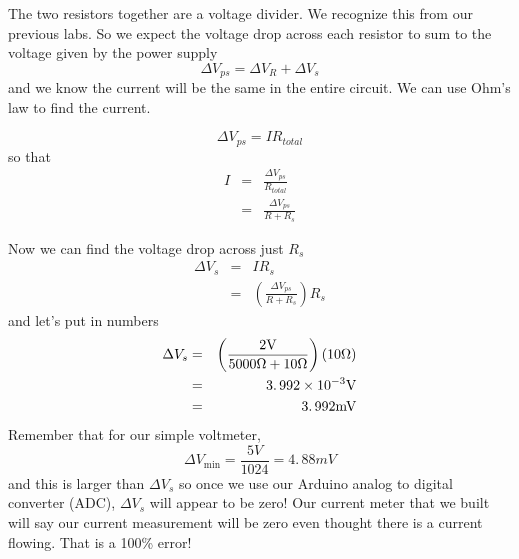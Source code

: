 The two resistors together are a voltage divider. We recognize this from our
previous labs. So we expect the voltage drop across each resistor to sum to
the voltage given by the power supply%
\begin{equation*}
\Delta V_{ps}=\Delta V_{R}+\Delta V_{s}
\end{equation*}%
and we know the current will be the same in the entire circuit. We can use
Ohm's law to find the current.

\begin{equation*}
\Delta V_{ps}=IR_{total}
\end{equation*}%
so that 
\begin{eqnarray*}
I &=&\frac{\Delta V_{ps}}{R_{total}} \\
&=&\frac{\Delta V_{ps}}{R+R_{s}}
\end{eqnarray*}

Now we can find the voltage drop across just $R_{s}$%
\begin{eqnarray*}
\Delta V_{s} &=&IR_{s} \\
&=&\left( \frac{\Delta V_{ps}}{R+R_{s}}\right) R_{s}
\end{eqnarray*}%
and let's put in numbers%
\begin{eqnarray*}
\Delta V_{s} &=&\left( \frac{2\unit{V}}{5000\unit{%
\Omega%
}+10\unit{%
\Omega%
}}\right) \left( 10\unit{%
\Omega%
}\right) \\
&=&3.\,\allowbreak 992\times 10^{-3}\unit{V} \\
&=&3.\,\allowbreak 992\unit{mV}
\end{eqnarray*}%
Remember that for our simple voltmeter, 
\begin{equation*}
\Delta V_{\min }=\frac{5\unit{V}}{1024}=4.\,\allowbreak 88\unit{mV}
\end{equation*}%
and this is larger than $\Delta V_{s}$ so once we use our Arduino analog to
digital converter (ADC), $\Delta V_{s}$ will appear to be zero! Our current
meter that we built will say our current measurement will be zero even
thought there is a current flowing. That is a 100\% error!

